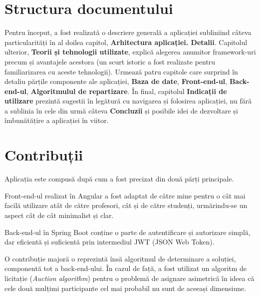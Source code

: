 \section{Structura documentului}

Pentru început, a fost realizată o descriere generală a aplicației subliniind câteva particularități în al doilea capitol, \textbf{Arhitectura aplicației. Detalii}.
Capitolul ulterior, \textbf{Teorii și tehnologii utilizate}, explică alegerea anumitor framework-uri precum și avantajele acestora (un scurt istoric a fost realizate pentru familiarizarea cu aceste tehnologii).
Urmează patru capitole care surprind în detaliu părțile componente ale aplicației, \textbf{Baza de date}, \textbf{Front-end-ul}, \textbf{Back-end-ul}, \textbf{Algoritmulul de repartizare}.
În final, capitolul \textbf{Indicații de utilizare} prezintă sugestii în legătură cu navigarea și folosirea aplicației, nu fără a sublinia în cele din urmă câteva \textbf{Concluzii} și posibile idei de dezvoltare și îmbunătățire a aplicației în viitor.

\section{Contribuții}
Aplicația \textbf{\thesistitle} este compusă după cum a fost precizat din două părți principale.

Front-end-ul realizat în Angular a fost adaptat de către mine pentru o cât mai facilă utilizare atât de către profesori, cât și de către studenți, urmărindu-se un aspect cât de cât minimalist și clar.

Back-end-ul în Spring Boot conține o parte de autentificare și autorizare simplă, dar eficientă și suficientă prin intermediul JWT (JSON Web Token).

O contribuție majoră o reprezintă însă algoritmul de determinare a soluției, componentă tot a back-end-ului. În cazul de față, a fost utilizat un algoritm de licitație (\textit{Auction algorithm}) pentru o problemă de asignare asimetrică în ideea că cele două mulțimi participante cel mai probabil nu sunt de aceeași dimensiune.